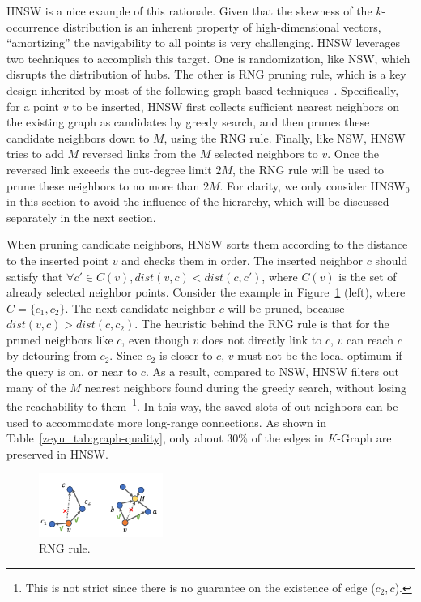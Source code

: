 \documentclass[11pt]{article}
\begin{document}
HNSW is a nice example of this rationale.
Given that the skewness of the $k$-occurrence distribution is an inherent property of high-dimensional vectors, ``amortizing'' the navigability to all points is very challenging.
HNSW leverages two techniques to accomplish this target.
One is randomization, like NSW, which disrupts the distribution of hubs.
The other is RNG pruning rule, which is a key design inherited by most of the following graph-based techniques~\cite{nsg,nssg,wang-survey}.
Specifically, for a point $v$ to be inserted, HNSW first collects sufficient nearest neighbors on the existing graph as candidates by greedy search, and then prunes these candidate neighbors down to $M$, using the RNG rule.
Finally, like NSW, HNSW tries to add $M$ reversed links from the $M$ selected neighbors to $v$.
Once the reversed link exceeds the out-degree limit $2M$, the RNG rule will be used to prune these neighbors to no more than $2M$.
For clarity, we only consider HNSW$_0$ in this section to avoid the influence of the hierarchy, which will be discussed separately in the next section.

When pruning candidate neighbors, HNSW sorts them according to the distance to the inserted point $v$ and checks them in order.
The inserted neighbor $c$ should satisfy that $\forall c'\in C(v), dist(v,c)<dist(c,c')$, where $C(v)$ is the set of already selected neighbor points. 
Consider the example in Figure~\ref{zeyu_fig:rng} (left), where $C=\{c_1,c_2\}$.
The next candidate neighbor $c$ will be pruned, because $dist(v,c)>dist(c,c_2)$.
The heuristic behind the RNG rule is that for the pruned neighbors like $c$, even though $v$ does not directly link to $c$, $v$ can reach $c$ by detouring from $c_2$.
Since $c_2$ is closer to $c$, $v$ must not be the local optimum if the query is on, or near to $c$.
As a result, compared to NSW, HNSW filters out many of the $M$ nearest neighbors found during the greedy search, without losing the reachability to them~\footnote{This is not strict since there is no guarantee on the existence of edge ($c_2,c$).}.
In this way, the saved slots of out-neighbors can be used to accommodate more long-range connections. 
As shown in Table~\ref{zeyu_tab:graph-quality}, only about 30\% of the edges in $K$-Graph are preserved in HNSW. 

\begin{figure}
    \centering
    \includegraphics[width=0.36\textwidth]{submissions/Zeyu2023/figs/rng.png}
    \caption{RNG rule.}
    \label{zeyu_fig:rng}
\end{figure}
\end{document}
